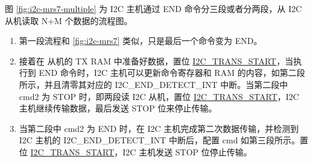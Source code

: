 \documentclass[main\_\_CN.tex]{subfiles}
\begin{document}
图 \ref{fig:i2c-mrs7-multiple} 为 I2C 主机通过 END 命令分三段或者分两段，从 I2C 从机读取 N+M 个数据的流程图。
\begin{enumerate}
    \item 第一段流程和 \ref{fig:i2c-mrs7} 类似，只是最后一个命令变为 END。
    \item 接着在 从机的 TX RAM 中准备好数据，置位 \hyperref[fielddesc:I2CTRANSSTART]{I2C\_TRANS\_START}，当执行到 END 命令时，I2C 主机可以更新命令寄存器和 RAM 的内容，如第二段所示，并且清零其对应的 I2C\_END\_DETECT\_INT 中断。当第二段中 cmd2 为 STOP 时，即两段读 I2C 从机，置位 \hyperref[fielddesc:I2CTRANSSTART]{I2C\_TRANS\_START}，I2C 主机继续传输数据，最后发送 STOP 位来停止传输。
    \item 当第二段中 cmd2 为 END 时，在 I2C 主机完成第二次数据传输，并检测到 I2C 主机的 I2C\_END\_DETECT\_INT 中断后，配置 cmd 如第三段所示。置位 \hyperref[fielddesc:I2CTRANSSTART]{I2C\_TRANS\_START}，I2C 主机发送 STOP 位停止传输。
\end{enumerate}
\end{document}
